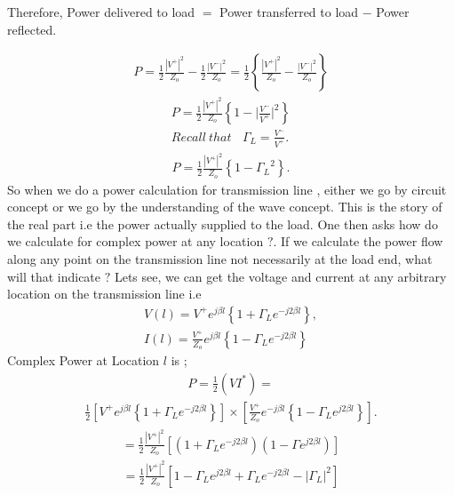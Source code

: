 Therefore, Power delivered to load $=$ Power transferred to load $-$ Power reflected.

\begin{align*} 
P= \frac{1}{2} \frac{ { |V^+ | }^2}{Z_o} -\frac{1}{2} \frac{ {|V^- |}^2 }{Z_o} = \frac{1}{2} \left\lbrace \frac{ { | V^+ | }^2}{Z_o} -\frac{ {|V^- |}^2 }{Z_o} \right\rbrace
\end{align*}
\begin{align*} 
P= \frac{1}{2} \frac{ { | V^+ | } ^2}{Z_o} \left\lbrace 1 - { | {\frac{V^-}{V^+}|^2}}\right\rbrace\\
Recall \ that\ \ \ \  \Gamma_L =\frac{V^-}{V^+}.
\end{align*}
\begin{align*}
P=\frac{1}{2} \frac{{| V^+ |}^2}{Z_o} \left\lbrace 1 - { \Gamma_L }^2 \right\rbrace.
\end{align*}
So when we do a power calculation for transmission line , either we go by circuit concept or we go by the understanding of the wave concept. This is the story of the real part i.e the power actually supplied to the load. One then asks how do we calculate for complex power at any location $?$. If we calculate the power flow along any point on the transmission line not necessarily at the load end, what will that indicate $?$ Lets see, we can get the voltage and current at any arbitrary location on the transmission line i.e
\begin{align*} 
V(l) = V^+ e^{j\beta l} \left\lbrace 1 + \Gamma_L e^{-j2\beta l} \right\rbrace ,\\ 
I(l) = \frac{V^+}{Z_o} e^{j\beta l} \left\lbrace 1 - \Gamma_L e^{-j2\beta l} \right\rbrace
\end{align*}
Complex Power at Location $l$ is ;
\begin{align*}
P = \frac{1}{2} (V I^*) =
\end{align*}
\begin{align*}
\frac{1}{2} [V^+ e^{j\beta l} \left\lbrace 1 + \Gamma_L e^{-j2\beta l} \right\rbrace ] \times [\frac{V^+}{Z_o} e^{-j\beta l} \left\lbrace 1 - \Gamma_L e^{j2\beta l} \right\rbrace].
\end{align*}
\begin{align*}
=\frac{1}{2} \frac{{| V ^+ |}^2}{Z_o} [( 1 + \Gamma_L e^{-j2\beta l})(1 - \Gamma e^{j2\beta l})]
\end{align*}
\begin{align*}
= \frac{1}{2} \frac{{ | V^+ | }^2}{Z_o} [ 1 - \Gamma_L e^{j2\beta l} + \Gamma_L e^ {-j2\beta l} - {| \Gamma_L | ^2}]
\end{align*}
